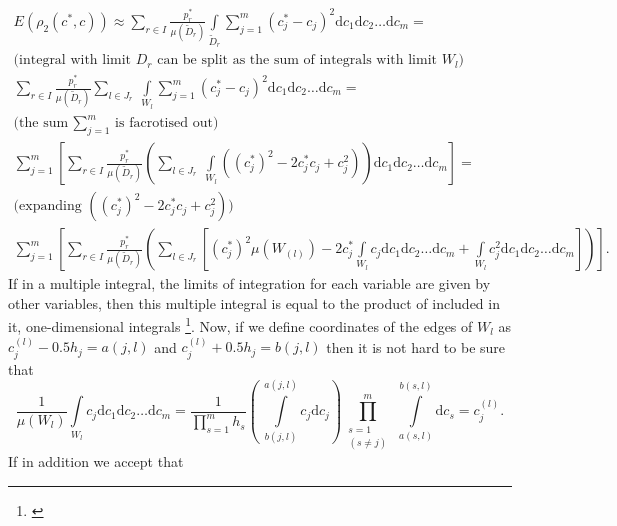 \begin{gather}
\nonumber
E(\rho_{2}(c^{*},c)) \approx \sum\limits_{r \in I} \frac{p_{r}^{*}}{\mu(\tilde{D}_{r})} \int\limits_{\tilde{D}_{r}} \sum\limits_{j=1}^{m}(c_{j}^{*}-c_{j})^{2}\mathrm{d}c_{1}\mathrm{d}c_{2}\dots \mathrm{d}c_{m} = \\
\nonumber 
\text{(integral with limit } D_{r} \text{ can be split as the sum of integrals with limit } W_{l} \text{)}\\
\sum\limits_{r \in I} \frac{p_{r}^{*}}{\mu(\tilde{D}_{r})} \sum\limits_{l \in J_{r}} \  \int\limits_{W_{l}} \sum\limits_{j=1}^{m}(c_{j}^{*}-c_{j})^{2}\mathrm{d}c_{1}\mathrm{d}c_{2}\dots \mathrm{d}c_{m} = \\
\nonumber
\text{(the sum } \sum_{j=1}^{m} \text{ is facrotised out)} \\
\nonumber
\sum\limits_{j=1}^{m}  \left[ \sum\limits_{r \in I} \frac{p_{r}^{*}}{\mu(\tilde{D}_{r})} \left( \sum\limits_{l \in J_{r}} \ \int\limits_{W_{l}} ((c_{j}^{*})^{2}-2c_{j}^{*}c_{j}+c_{j}^{2}) \right) \mathrm{d}c_{1}\mathrm{d}c_{2}\dots \mathrm{d}c_{m} \right] = \\
\nonumber
\text{(expanding } ((c_{j}^{*})^{2}-2c_{j}^{*}c_{j}+c_{j}^{2}) \text{)}\\
\sum\limits_{j=1}^{m}  \left[ \sum\limits_{r \in I} \frac{p_{r}^{*}}{\mu(\tilde{D}_{r})} \left( \sum\limits_{l \in J_{r}} \left[ (c_{j}^{*})^{2} \mu(W_{(l)}) - 2c_{j}^{*} \int\limits_{W_{l}} c_{j} \mathrm{d}c_{1}\mathrm{d}c_{2}\dots \mathrm{d}c_{m} + \int\limits_{W_{l}} c_{j}^{2} \mathrm{d}c_{1}\mathrm{d}c_{2}\dots \mathrm{d}c_{m} \right] \right) \right]. \label{eq-simplification-chain}
\end{gather}
If in a multiple integral, the limits of integration for each variable are given by other variables, then this multiple integral is equal to the product of included in it, one-dimensional integrals \footnote{\cite{stewart_2008_int}}. Now, if we define coordinates of the edges of $W_{l}$ as $c_{j}^{(l)} - 0.5h_{j} = a(j,l)$ and $c_{j}^{(l)} + 0.5h_{j} = b(j,l)$ then it is not hard to be sure that 
\begin{equation}
\frac{1}{\mu(W_{l})} \int\limits_{W_l} c_{j} \mathrm{d} c_{1} \mathrm{d} c_{2} \ldots  \mathrm{d} c_{m} 
	= \dfrac{1}{\prod\limits_{s=1}^{m}h_{s}}
	\left( \  \int\limits_{b(j,l)}^{a(j,l)} c_{j}  \mathrm{d} c_{j}\right) 
	\prod_{\substack{s=1\\ (s\ne j)}}^m \ 
	\int\limits_{a(s,l)}^{b(s,l)} \!  \mathrm{d} c_{s} 
	= c_{j}^{(l)}.
\end{equation}
If in addition we accept that
